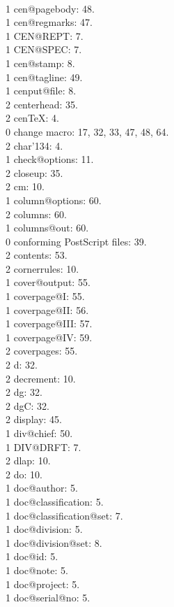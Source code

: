 \\1 cen@pagebody: 48.
\\1 cen@regmarks: 47.
\\1 CEN@REPT: 7.
\\1 CEN@SPEC: 7.
\\1 cen@stamp: 8.
\\1 cen@tagline: 49.
\\1 cenput@file: 8.
\\2 centerhead: 35.
\\2 cenTeX: 4.
\\0 change macro: 17, 32, 33, 47, 48, 64.
\\2 char'134: 4.
\\1 check@options: 11.
\\2 closeup: 35.
\\2 cm: 10.
\\1 column@options: 60.
\\2 columns: 60.
\\1 columns@out: 60.
\\0 conforming PostScript files: 39.
\\2 contents: 53.
\\2 cornerrules: 10.
\\1 cover@output: 55.
\\1 coverpage@I: 55.
\\1 coverpage@II: 56.
\\1 coverpage@III: 57.
\\1 coverpage@IV: 59.
\\2 coverpages: 55.
\\2 d: 32.
\\2 decrement: 10.
\\2 dg: 32.
\\2 dgC: 32.
\\2 display: 45.
\\1 div@chief: 50.
\\1 DIV@DRFT: 7.
\\2 dlap: 10.
\\2 do: 10.
\\1 doc@author: 5.
\\1 doc@classification: 5.
\\1 doc@classification@set: 7.
\\1 doc@division: 5.
\\1 doc@division@set: 8.
\\1 doc@id: 5.
\\1 doc@note: 5.
\\1 doc@project: 5.
\\1 doc@serial@no: 5.
